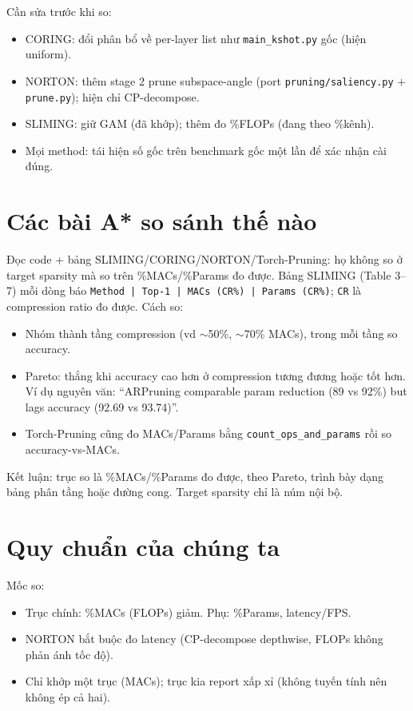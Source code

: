\documentclass[11pt,a4paper]{article}
\newcommand{\code}[1]{\texttt{#1}}
\begin{document}
\medskip
Cần sửa trước khi so:
\begin{itemize}
  \item CORING: đổi phân bổ về per-layer list như \code{main\_kshot.py} gốc (hiện uniform).
  \item NORTON: thêm stage 2 prune subspace-angle (port \code{pruning/saliency.py} $+$ \code{prune.py}); hiện chỉ CP-decompose.
  \item SLIMING: giữ GAM (đã khớp); thêm đo \%FLOPs (đang theo \%kênh).
  \item Mọi method: tái hiện số gốc trên benchmark gốc một lần để xác nhận cài đúng.
\end{itemize}

\section{Các bài A* so sánh thế nào}

Đọc code + bảng SLIMING/CORING/NORTON/Torch-Pruning: họ không so ở target sparsity mà so trên
\%MACs/\%Params đo được. Bảng SLIMING (Table 3--7) mỗi dòng báo \code{Method | Top-1 | MACs (CR\%) |
Params (CR\%)}; \code{CR} là compression ratio đo được. Cách so:
\begin{itemize}
  \item Nhóm thành tầng compression (vd $\sim$50\%, $\sim$70\% MACs), trong mỗi tầng so accuracy.
  \item Pareto: thắng khi accuracy cao hơn ở compression tương đương hoặc tốt hơn. Ví dụ nguyên văn: ``ARPruning comparable param reduction (89 vs 92\%) but lags accuracy (92.69 vs 93.74)''.
  \item Torch-Pruning cũng đo MACs/Params bằng \code{count\_ops\_and\_params} rồi so accuracy-vs-MACs.
\end{itemize}
Kết luận: trục so là \%MACs/\%Params đo được, theo Pareto, trình bày dạng bảng phân tầng hoặc đường
cong. Target sparsity chỉ là núm nội bộ.

\section{Quy chuẩn của chúng ta}

Mốc so:
\begin{itemize}
  \item Trục chính: \%MACs (FLOPs) giảm. Phụ: \%Params, latency/FPS.
  \item NORTON bắt buộc đo latency (CP-decompose depthwise, FLOPs không phản ánh tốc độ).
  \item Chỉ khớp một trục (MACs); trục kia report xấp xỉ (không tuyến tính nên không ép cả hai).
\end{itemize}
\end{document}
